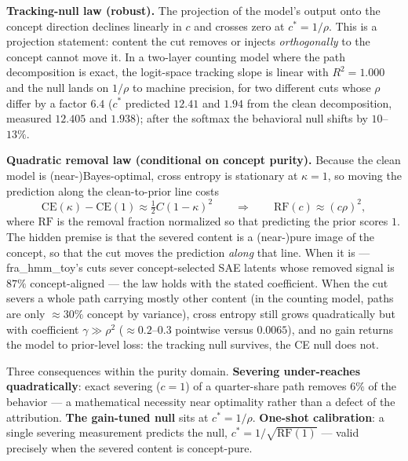 \documentclass{article}
\newcommand{\RF}{\mathrm{RF}}
\theoremstyle{definition}
\begin{document}
\textbf{Tracking-null law (robust).} The projection of the model's output
onto the concept direction declines linearly in $c$ and crosses zero at
$c^\ast = 1/\rho$. This is a projection statement: content the cut removes
or injects \emph{orthogonally} to the concept cannot move it. In a
two-layer counting model where the path decomposition is exact, the
logit-space tracking slope is linear with $R^2 = 1.000$ and the null lands
on $1/\rho$ to machine precision, for two different cuts whose $\rho$
differ by a factor $6.4$ ($c^\ast$ predicted $12.41$ and $1.94$ from the
clean decomposition, measured $12.405$ and $1.938$); after the softmax the
behavioral null shifts by $10$--$13\%$.

\textbf{Quadratic removal law (conditional on concept purity).} Because the
clean model is (near-)Bayes-optimal, cross entropy is stationary at
$\kappa = 1$, so moving the prediction along the clean-to-prior line costs
\begin{equation}\label{quadlaw}
\mathrm{CE}(\kappa) - \mathrm{CE}(1) \approx \tfrac12 C (1-\kappa)^2
\qquad\Longrightarrow\qquad
\RF(c) \approx (c\rho)^2 ,
\end{equation}
where $\RF$ is the removal fraction normalized so that predicting the prior
scores $1$. The hidden premise is that the severed content is a (near-)pure
image of the concept, so that the cut moves the prediction \emph{along}
that line. When it is --- fra\_hmm\_toy's cuts sever concept-selected SAE
latents whose removed signal is $87\%$ concept-aligned --- the law holds
with the stated coefficient. When the cut severs a whole path carrying
mostly other content (in the counting model, paths are only $\approx 30\%$
concept by variance), cross entropy still grows quadratically but with
coefficient $\gamma \gg \rho^2$ ($\approx 0.2$--$0.3$ pointwise versus
$0.0065$), and no gain
returns the model to prior-level loss: the tracking null survives, the CE
null does not.

Three consequences within the purity domain. \textbf{Severing under-reaches
quadratically}: exact severing ($c=1$) of a quarter-share path removes
$6\%$ of the behavior --- a mathematical necessity near optimality rather
than a defect of the attribution. \textbf{The gain-tuned null} sits at
$c^\ast = 1/\rho$. \textbf{One-shot calibration}: a single severing
measurement predicts the null, $c^\ast = 1/\sqrt{\RF(1)}$ --- valid
precisely when the severed content is concept-pure.
\end{document}

